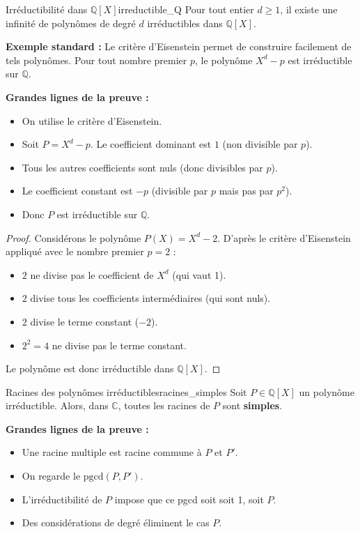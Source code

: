 \documentclass{prepacours}
\begin{document}
\begin{proposition}{Irréductibilité dans $\mathbb{Q}[X]$}{irreductible_Q}
    Pour tout entier $d \ge 1$, il existe une infinité de polynômes de degré $d$ irréductibles dans $\mathbb{Q}[X]$.
    
    \textbf{Exemple standard :} Le critère d'Eisenstein permet de construire facilement de tels polynômes.
    Pour tout nombre premier $p$, le polynôme $X^d - p$ est irréductible sur $\mathbb{Q}$.
\end{proposition}

\noindent \textbf{Grandes lignes de la preuve :}
\begin{itemize}
    \item On utilise le critère d'Eisenstein.
    \item Soit $P = X^d - p$. Le coefficient dominant est $1$ (non divisible par $p$).
    \item Tous les autres coefficients sont nuls (donc divisibles par $p$).
    \item Le coefficient constant est $-p$ (divisible par $p$ mais pas par $p^2$).
    \item Donc $P$ est irréductible sur $\mathbb{Q}$.
\end{itemize}

\begin{proof}
    Considérons le polynôme $P(X) = X^d - 2$.
    D'après le critère d'Eisenstein appliqué avec le nombre premier $p=2$ :
    \begin{itemize}
        \item $2$ ne divise pas le coefficient de $X^d$ (qui vaut 1).
        \item $2$ divise tous les coefficients intermédiaires (qui sont nuls).
        \item $2$ divise le terme constant ($-2$).
        \item $2^2 = 4$ ne divise pas le terme constant.
    \end{itemize}
    Le polynôme est donc irréductible dans $\mathbb{Q}[X]$.
\end{proof}

\begin{proposition}{Racines des polynômes irréductibles}{racines_simples}
    Soit $P \in \mathbb{Q}[X]$ un polynôme irréductible.
    Alors, dans $\mathbb{C}$, toutes les racines de $P$ sont \textbf{simples}.
\end{proposition}

\noindent \textbf{Grandes lignes de la preuve :}
\begin{itemize}
    \item Une racine multiple est racine commune à $P$ et $P'$.
    \item On regarde le $\text{pgcd}(P, P')$.
    \item L'irréductibilité de $P$ impose que ce pgcd soit soit 1, soit $P$.
    \item Des considérations de degré éliminent le cas $P$.
\end{itemize}
\end{document}
